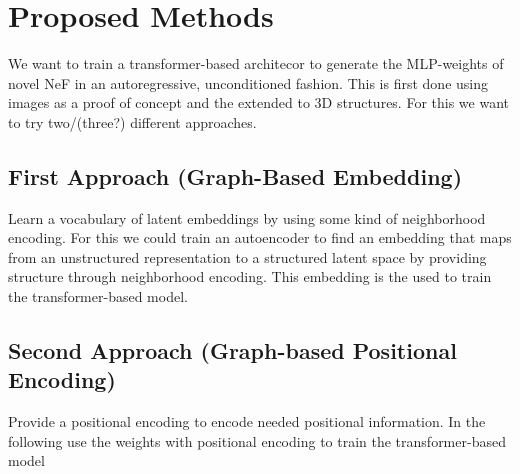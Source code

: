 \section{Proposed Methods}
\label{sec:method}
We want to train a transformer-based architecor to generate the MLP-weights of novel
NeF in an autoregressive, unconditioned fashion. This is first done using images as a 
proof of concept and the extended to 3D structures. For this we want to try two/(three?) 
different approaches.
\subsection{First Approach (Graph-Based Embedding)}
Learn a vocabulary of latent embeddings by using some kind of neighborhood encoding.
For this we could train an autoencoder to find an embedding that maps from an 
unstructured representation to a structured latent space by providing structure through 
neighborhood encoding. This embedding is the used to train the transformer-based model.
\subsection{Second Approach (Graph-based Positional Encoding)}
Provide a positional encoding to encode needed positional information. In the following
use the weights with positional encoding to train the transformer-based model

